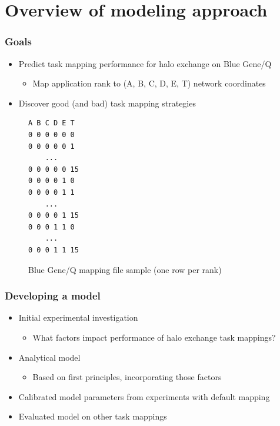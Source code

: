 \documentclass{beamer}
\begin{document}
\section{Overview of modeling approach}
\begin{frame}[fragile]
\frametitle{Goals}
\begin{itemize}
  \item Predict task mapping performance for halo exchange on Blue Gene/Q
  \begin{itemize}
    \item Map application rank to (A, B, C, D, E, T) network coordinates
  \end{itemize}
  \item Discover good (and bad) task mapping strategies
\end{itemize}
\vspace{-1em}
\begin{figure}
  \centering
  \caption{Blue Gene/Q mapping file sample (one row per rank)}
  \begin{lstlisting}[basicstyle=\footnotesize\ttfamily, frame=lines,columns=fixed]
A B C D E T
0 0 0 0 0 0
0 0 0 0 0 1
    ...
0 0 0 0 0 15
0 0 0 0 1 0
0 0 0 0 1 1
    ...
0 0 0 0 1 15
0 0 0 1 1 0
    ...
0 0 0 1 1 15
  \end{lstlisting}
\end{figure}
\end{frame}

\begin{frame}
\frametitle{Developing a model}
\begin{itemize}
  \item Initial experimental investigation
  \begin{itemize}
    \item What factors impact performance of halo exchange task mappings?
  \end{itemize}
  \item Analytical model 
  \begin{itemize}
    \item Based on first principles, incorporating those factors
  \end{itemize}
  \item Calibrated model parameters from experiments with default mapping
  \item Evaluated model on other task mappings
\end{itemize}
\end{frame}
\end{document}
